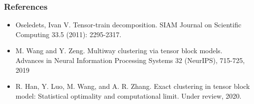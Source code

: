 \documentclass[10pt, mathserif]{beamer} %
\theoremstyle{definition}
\theoremstyle{plain}
\begin{document}
\begin{frame}
\frametitle{References}
\tiny
\begin{itemize}
\item Oseledets, Ivan V. Tensor-train decomposition. SIAM Journal on Scientific Computing 33.5 (2011): 2295-2317.
\item M. Wang and Y. Zeng. Multiway clustering via tensor block models. Advances in Neural Information Processing Systems 32 (NeurIPS), 715-725, 2019
\item R. Han, Y. Luo, M. Wang, and A. R. Zhang. Exact clustering in tensor block model: Statistical optimality and computational limit. Under review, 2020.
\end{itemize}




\end{frame}
\end{document}
